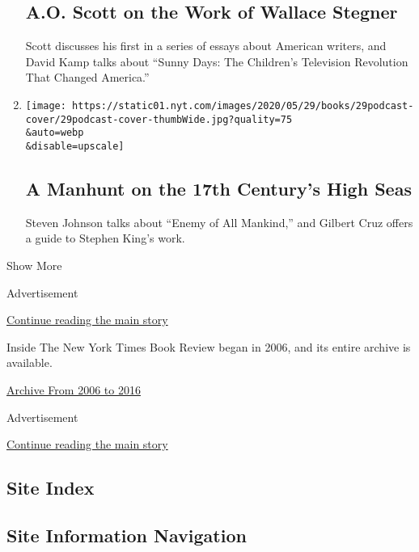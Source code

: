 \begin{enumerate}
  \hypertarget{ao-scott-on-the-work-of-wallace-stegner}{%
  \subsection{A.O. Scott on the Work of Wallace
  Stegner}\label{ao-scott-on-the-work-of-wallace-stegner}}

  Scott discusses his first in a series of essays about American
  writers, and David Kamp talks about ``Sunny Days: The Children's
  Television Revolution That Changed America.''
\item
  \href{/2020/05/29/books/review/podcast-enemy-of-all-mankind-piracy-steven-johnson-stephen-king-gilbert-cruz.html}{}

  \texttt{[image: https://static01.nyt.com/images/2020/05/29/books/29podcast-cover/29podcast-cover-thumbWide.jpg?quality=75\\\&auto=webp\\\&disable=upscale]}

  \hypertarget{a-manhunt-on-the-17th-centurys-high-seas}{%
  \subsection{A Manhunt on the 17th Century's High
  Seas}\label{a-manhunt-on-the-17th-centurys-high-seas}}

  Steven Johnson talks about ``Enemy of All Mankind,'' and Gilbert Cruz
  offers a guide to Stephen King's work.
\end{enumerate}

Show More

Advertisement

\protect\hyperlink{after-mid1}{Continue reading the main story}

Inside The New York Times Book Review began in 2006, and its entire
archive is available.

\href{http://www.nytimes.com/ref/books/books-podcast-archive.html}{Archive
From 2006 to 2016}

Advertisement

\protect\hyperlink{after-mktg}{Continue reading the main story}

\hypertarget{site-index}{%
\subsection{Site Index}\label{site-index}}

\hypertarget{site-information-navigation}{%
\subsection{Site Information
Navigation}\label{site-information-navigation}}

